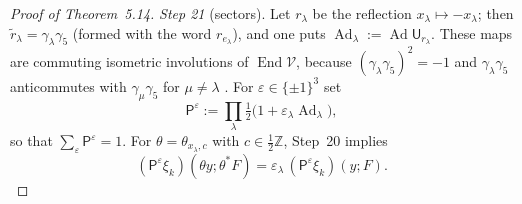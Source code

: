 \documentclass[11pt,letterpaper,reqno]{amsart}
\theoremstyle{definition}
\begin{document}
\begin{proof}[Proof of Theorem~5.14]
\emph{Step 21} (sectors).
Let $r_\lambda$ be the reflection $x_\lambda\mapsto-x_\lambda$; then $\tilde r_\lambda=\gamma_\lambda\gamma_5$ (formed with the word $r_{e_\lambda}$), and one puts $\operatorname{Ad}_\lambda:=\allowbreak \operatorname{Ad}\mathsf U_{r_\lambda}$.
These maps are commuting isometric involutions of $\operatorname{End}\mathcal V$, because $(\gamma_\lambda\gamma_5)^2=-1$ and $\gamma_\lambda\gamma_5$ anticommutes with $\gamma_\mu\gamma_5$ for $\mu\ne\lambda$ \cite[Definition~2.7]{QEDII}.
For $\varepsilon\in\{\pm1\}^3$ set
\begin{equation*}
\mathsf P^\varepsilon:=\prod_\lambda\tfrac12\bigl(1+\varepsilon_\lambda\operatorname{Ad}_\lambda\bigr),
\end{equation*}
so that $\sum_\varepsilon\mathsf P^\varepsilon=1$.
For $\theta=\theta_{x_\lambda,c}$ with $c\in\frac12\mathbb Z$, Step~20 implies
\begin{equation*}
(\mathsf P^\varepsilon\xi_k)(\theta y;\theta^*F)=\varepsilon_\lambda\,(\mathsf P^\varepsilon\xi_k)(y;F).
\end{equation*}


\end{proof}
\end{document}
